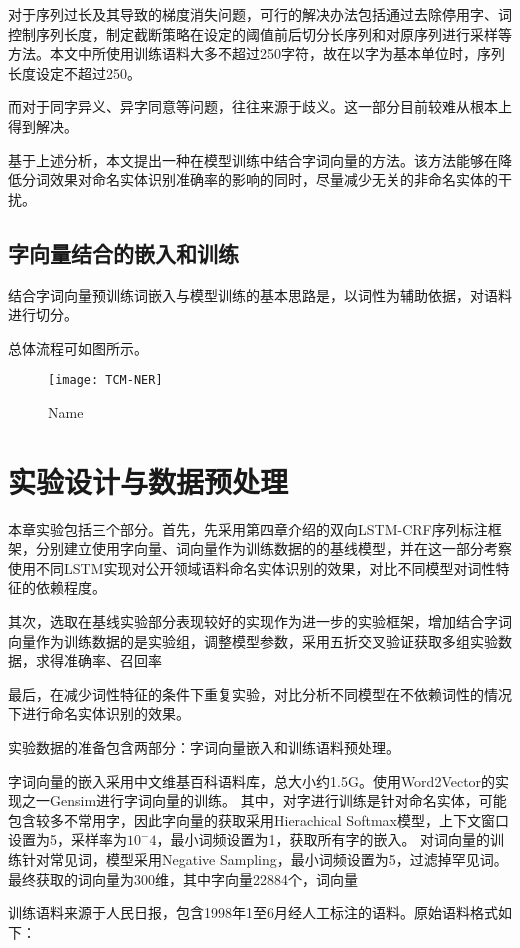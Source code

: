 对于序列过长及其导致的梯度消失问题，可行的解决办法包括通过去除停用字、词控制序列长度，制定截断策略在设定的阈值前后切分长序列和对原序列进行采样等方法。本文中所使用训练语料大多不超过250字符，故在以字为基本单位时，序列长度设定不超过250。

而对于同字异义、异字同意等问题，往往来源于歧义。这一部分目前较难从根本上得到解决。

基于上述分析，本文提出一种在模型训练中结合字词向量的方法。该方法能够在降低分词效果对命名实体识别准确率的影响的同时，尽量减少无关的非命名实体的干扰。
\subsection{字向量结合的嵌入和训练}
结合字词向量预训练词嵌入与模型训练的基本思路是，以词性为辅助依据，对语料进行切分。

总体流程可如图所示。
\begin{figure}[htpb]
    \centering
    \caption{Name}
    \texttt{[image: TCM-NER]}
    \label{fig:exp_frame}
\end{figure}

\section{实验设计与数据预处理}
本章实验包括三个部分。首先，先采用第四章介绍的双向LSTM-CRF序列标注框架，分别建立使用字向量、词向量作为训练数据的的基线模型，并在这一部分考察使用不同LSTM实现对公开领域语料命名实体识别的效果，对比不同模型对词性特征的依赖程度。

其次，选取在基线实验部分表现较好的实现作为进一步的实验框架，增加结合字词向量作为训练数据的是实验组，调整模型参数，采用五折交叉验证获取多组实验数据，求得准确率、召回率

最后，在减少词性特征的条件下重复实验，对比分析不同模型在不依赖词性的情况下进行命名实体识别的效果。


实验数据的准备包含两部分：字词向量嵌入和训练语料预处理。

字词向量的嵌入采用中文维基百科语料库，总大小约1.5G。使用Word2Vector的实现之一Gensim进行字词向量的训练。
其中，对字进行训练是针对命名实体，可能包含较多不常用字，因此字向量的获取采用Hierachical Softmax模型，上下文窗口设置为5，采样率为$10^-4$，最小词频设置为1，获取所有字的嵌入。
对词向量的训练针对常见词，模型采用Negative Sampling，最小词频设置为5，过滤掉罕见词。
最终获取的词向量为300维，其中字向量22884个，词向量

训练语料来源于人民日报，包含1998年1至6月经人工标注的语料。原始语料格式如下：

